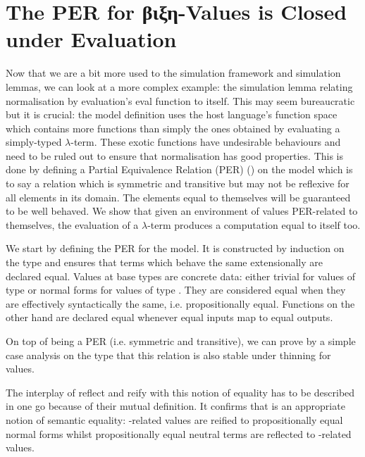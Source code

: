 \section{The PER for βιξη-Values is Closed under Evaluation}

Now that we are a bit more used to the simulation framework and simulation lemmas,
we can look at a more complex example: the simulation lemma relating normalisation
by evaluation's eval function to itself. This may seem bureaucratic but it is crucial:
the model definition uses the host language's function space which contains more functions
than simply the ones obtained by evaluating a simply-typed $λ$-term. These exotic functions
have undesirable behaviours and need to be ruled out to ensure that normalisation has good
properties. This is done by defining a Partial Equivalence Relation (PER) (\cite{mitchell1996foundations})
on the model which is to say a relation which is symmetric and transitive but may
not be reflexive for all elements in its domain. The elements equal to themselves will be
guaranteed to be well behaved. We show that given an environment of values PER-related to
themselves, the evaluation of a $λ$-term produces a computation equal to itself too.


We start by defining the PER for the model. It is constructed by induction on the type
and ensures that terms which behave the same extensionally are declared equal. Values at
base types are concrete data: either trivial for values of type  or normal
forms for values of type . They are considered equal when they are effectively
syntactically the same, i.e. propositionally equal. Functions on the other hand are
declared equal whenever equal inputs map to equal outputs.


On top of being a PER (i.e. symmetric and transitive), we can prove by a simple case analysis
on the type that this relation is also stable under thinning for  values.


The interplay of reflect and reify with this notion of equality has to be described
in one go because of their mutual definition. It confirms that  is an appropriate
notion of semantic equality: -related values are reified to propositionally
equal normal forms whilst propositionally equal neutral terms are reflected
to -related values.


